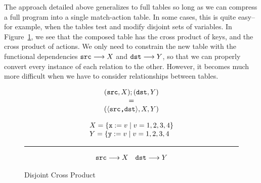   

The approach detailed above generalizes to full tables so long as we
can compress a full program into a single match-action table. In some
cases, this is quite easy--for example, when the tables test and
modify disjoint sets of variables. In Figure~\ref{fig:cross-product-ex},
we see that the composed table has the cross product of keys, and the
cross product of actions. We only need to constrain the new table with
the functional dependencies $\texttt{src} \longrightarrow X$ and
$\texttt{dst} \longrightarrow Y$, so that we can properly convert
every instance of each relation to the other. However, it becomes much
more difficult when we have to consider relationships between tables.

\begin{figure}[ptb]
  \begin{minipage}{0.32\columnwidth}
  \[\begin{array}{c}
      (\texttt{src}, X); (\texttt{dst}, Y)
      \\ = \\
      (\langle\texttt{src,dst}\rangle, X, Y)
    \end{array} \]
\end{minipage} \hfill \vline \hfill \begin{minipage}{0.66\columnwidth}
  \[\begin{array}l
      X = \{\var x:=v \mid v = 1,2,3,4\}\\
      Y = \{\var y:=v \mid v = 1,2,3,4
    \end{array}\]
  \hrule
  \[\begin{array}{cc}
      \texttt{src} \longrightarrow X
      &\texttt{dst} \longrightarrow Y
    \end{array} \]
\end{minipage}
\caption{Disjoint Cross Product}
  \label{fig:cross-product-ex}
\end{figure}

